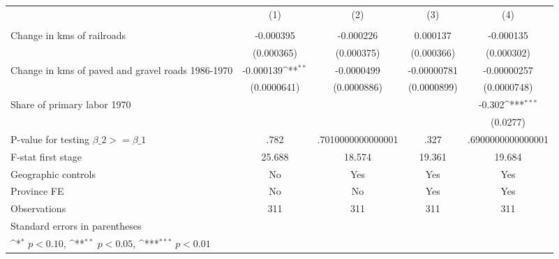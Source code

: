 {
\def\sym#1{\ifmmode^{#1}\else\(^{#1}\)\fi}
\begin{tabular}{l*{4}{c}}
\hline\hline
                &\multicolumn{1}{c}{(1)}&\multicolumn{1}{c}{(2)}&\multicolumn{1}{c}{(3)}&\multicolumn{1}{c}{(4)}\\
                &\multicolumn{1}{c}{}&\multicolumn{1}{c}{}&\multicolumn{1}{c}{}&\multicolumn{1}{c}{}\\
\hline
Change in kms of railroads&-0.000395         &-0.000226         & 0.000137         &-0.000135         \\
                &(0.000365)         &(0.000375)         &(0.000366)         &(0.000302)         \\
[1em]
Change in kms of paved and gravel roads 1986-1970&-0.000139\sym{**} &-0.0000499         &-0.00000781         &-0.00000257         \\
                &(0.0000641)         &(0.0000886)         &(0.0000899)         &(0.0000748)         \\
[1em]
Share of primary labor 1970&                  &                  &                  &   -0.302\sym{***}\\
                &                  &                  &                  & (0.0277)         \\
\hline
P-value for testing $\beta\_{2} >= \beta\_{1}$&     .782         &.7010000000000001         &     .327         &.6900000000000001         \\
F-stat first stage&   25.688         &   18.574         &   19.361         &   19.684         \\
Geographic controls&       No         &      Yes         &      Yes         &      Yes         \\
Province FE     &       No         &       No         &      Yes         &      Yes         \\
Observations    &      311         &      311         &      311         &      311         \\
\hline\hline
\multicolumn{5}{l}{\footnotesize Standard errors in parentheses}\\
\multicolumn{5}{l}{\footnotesize \sym{*} \(p<0.10\), \sym{**} \(p<0.05\), \sym{***} \(p<0.01\)}\\
\end{tabular}
}
